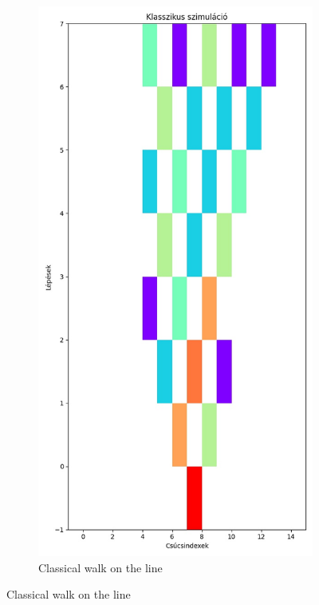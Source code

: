 \begin{figure}[H]
  \centering
  \begin{subfigure}{.45\linewidth}
    \centering
    \includegraphics[width=\linewidth]{./figures/results/path/classical.jpg}
    \caption{Classical walk on the line}

\end{subfigure}
\end{figure}
